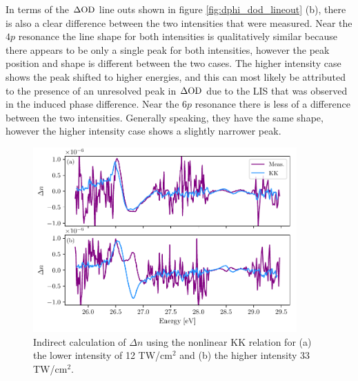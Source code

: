 In terms of the $\Delta\mathrm{OD}$ line outs shown in figure \ref{fig:dphi_dod_lineout} (b), there is also a clear difference between the two intensities that were measured.  Near the $4p$ resonance the line shape for both intensities is qualitatively similar because there appears to be only a single peak for both intensities, however the peak position and shape is different between the two cases.  The higher intensity case shows the peak shifted to higher energies, and this can most likely be attributed to the presence of an unresolved peak in $\Delta\mathrm{OD}$ due to the LIS that was observed in the induced phase difference.  Near the $6p$ resonance there is less of a difference between the two intensities.  Generally speaking, they have the same shape, however the higher intensity case shows a slightly narrower peak.

\begin{figure}
	\centering
	\includegraphics[width=0.9\textwidth]{figures/CATS/dn_kk_lineout.pdf}
	\caption[Nonlinear KK relation applied to CATS measurement]{Indirect calculation of $\Delta n$ using the nonlinear KK relation for (a) the lower intensity of 12 TW/cm$^2$ and (b) the higher intensity 33 TW/cm$^2$.}
	\label{fig:dn_kk_lineout}
\end{figure}

